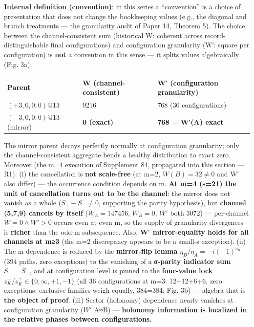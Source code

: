 \documentclass[
]{article}
\newcounter{none} %
\begin{document}
\textbf{Internal definition (convention)}: in this series a
``convention'' is a choice of presentation that does not change the
bookkeeping values (e.g., the diagonal and branch treatments --- the
granularity audit of Paper 14, Theorem 5). The choice between the
channel-consistent sum (historical W: coherent across
record-distinguishable final configurations) and configuration
granularity (W′: square per configuration) is \textbf{not} a convention
in this sense --- it splits values algebraically (Fig. 3a):

{\def\LTcaptype{none} %
\begin{longtable}[]{@{}lll@{}}
\toprule\noalign{}
Parent & W (channel-consistent) & W′ (configuration granularity) \\
\midrule\noalign{}
\endhead
\bottomrule\noalign{}
\endlastfoot
\((+3,0,0,0)\)@13 & 9216 & 768 (30 configurations) \\
\((-3,0,0,0)\)@13 (mirror) & \textbf{0 (exact)} & \textbf{768 = W′(A)
exact} \\
\end{longtable}
}

The mirror parent decays perfectly normally at configuration
granularity; only the channel-consistent aggregate bends a healthy
distribution to exact zero. Moreover (the m=4 execution of Supplement
84, propagated into this section --- R1): (i) the cancellation is
\textbf{not scale-free} (at m=2, \(W(B)=32\neq0\) and W′ also differ)
--- the occurrence condition depends on m. \textbf{At m=4 (s=21) the
unit of cancellation turns out to be the channel}: the mirror does not
vanish as a whole (\(S_+-S_-\neq0\), supporting the parity hypothesis),
but \textbf{channel (5,7,9) cancels by itself} (\(W_A=147456\),
\(W_B=0\), \(W'\) both 3072) --- per-channel \(W=0\wedge W'>0\) occurs
even at even m, so the supply of granularity divergences is
\textbf{richer} than the odd-m subsequence. Also, \textbf{W′
mirror-equality holds for all channels at m≥3} (the m=2 discrepancy
appears to be a small-s exception). (ii) The m-dependence is reduced by
the \textbf{mirror-flip lemma} \(\eta_B/\eta_A=-i(-1)^{\sigma_0}\) (394
paths, zero exceptions) to the vanishing of a \textbf{σ-parity indicator
sum} \(S_+=S_-\), and at configuration level is pinned to the
\textbf{four-value lock} \(z^-_K/z^+_K\in\{0,\infty,+1,-1\}\) (all 36
configurations at m=3: 12+12+6+6, zero exceptions; exclusive families
weigh equally, 384=384; Fig. 3b) --- algebra that is \textbf{the object
of proof}. (iii) Sector (holonomy) dependence nearly vanishes at
configuration granularity (\(W'\) A≈B) --- \textbf{holonomy information
is localized in the relative phases between configurations}.
\end{document}
